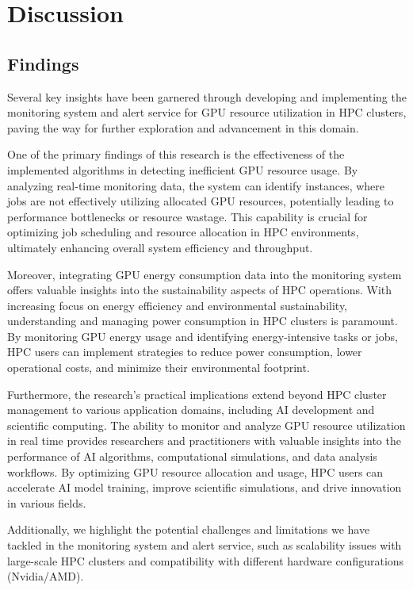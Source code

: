 \chapter{Discussion}
\label{chap:discussion}
\section{Findings}
Several key insights have been garnered through developing and implementing the monitoring system and alert service for GPU resource utilization in HPC clusters, paving the way for further exploration and advancement in this domain.

One of the primary findings of this research is the effectiveness of the implemented algorithms in detecting inefficient GPU resource usage. By analyzing real-time monitoring data, the system can identify instances, where jobs are not effectively utilizing allocated GPU resources, potentially leading to performance bottlenecks or resource wastage. This capability is crucial for optimizing job scheduling and resource allocation in HPC environments, ultimately enhancing overall system efficiency and throughput.

Moreover, integrating GPU energy consumption data into the monitoring system offers valuable insights into the sustainability aspects of HPC operations. With increasing focus on energy efficiency and environmental sustainability, understanding and managing power consumption in HPC clusters is paramount. By monitoring GPU energy usage and identifying energy-intensive tasks or jobs, HPC users can implement strategies to reduce power consumption, lower operational costs, and minimize their environmental footprint.

Furthermore, the research's practical implications extend beyond HPC cluster management to various application domains, including AI development and scientific computing. The ability to monitor and analyze GPU resource utilization in real time provides researchers and practitioners with valuable insights into the performance of AI algorithms, computational simulations, and data analysis workflows. By optimizing GPU resource allocation and usage, HPC users can accelerate AI model training, improve scientific simulations, and drive innovation in various fields.

Additionally, we highlight the potential challenges and limitations we have tackled in the monitoring system and alert service, such as scalability issues with large-scale HPC clusters and compatibility with different hardware configurations (Nvidia/AMD).

